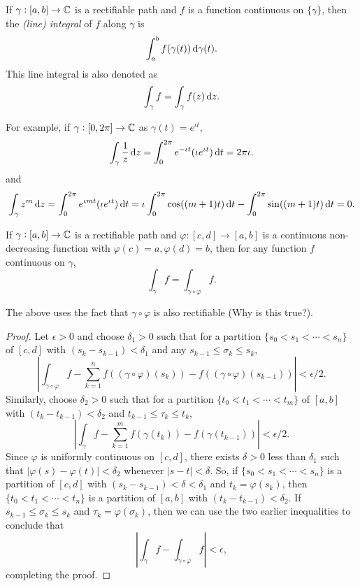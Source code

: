 	\begin{fdef}
		If $\gamma : [a,b] \to \mathbb{C}$ is a rectifiable path and $f$ is a function continuous on $\{\gamma\}$, then the \emph{(line) integral} of $f$ along $\gamma$ is
		\[ \int_a^b f(\gamma(t)) \dif \gamma(t). \]
		This line integral is also denoted as
		\[ \int_\gamma f = \int_\gamma f(z) \dif z. \]
	\end{fdef}

	For example, if $\gamma:[0,2\pi] \to \mathbb{C}$ as $\gamma(t) = e^{\iota t}$,
	\[ \int_\gamma \frac{1}{z} \dif z = \int_0^{2\pi} e^{-\iota t} (\iota e^{\iota t}) \dif t = 2 \pi \iota. \]
	and
	\[ \int_\gamma z^m \dif z = \int_0^{2\pi} e^{\iota m t} (\iota e^{\iota t}) \dif t = \iota \int_0^{2\pi} \cos((m+1)t) \dif t - \int_0^{2\pi} \sin((m+1)t) \dif t = 0. \]

	\begin{theorem}
		If $\gamma : [a,b] \to \mathbb{C}$ is a rectifiable path and $\varphi : [c,d] \to [a,b]$ is a continuous non-decreasing function with $\varphi(c) = a, \varphi(d) = b$, then for any function $f$ continuous on $\gamma$,
		\[ \int_\gamma f = \int_{\gamma \circ \varphi} f. \]
	\end{theorem}

	\begin{remark}
		The above uses the fact that $\gamma \circ \varphi$ is also rectifiable (Why is this true?).
	\end{remark}

	\begin{proof}
		Let $\epsilon > 0$ and choose $\delta_1 > 0$ such that for a partition $\{ s_0 < s_1 < \cdots  < s_n \}$ of $[c,d]$ with $(s_{k} - s_{k-1}) < \delta_1$ and any $s_{k-1} \le \sigma_k \le s_k$,
		\[ \left| \int_{\gamma \circ \varphi} f - \sum_{k=1}^{n} f((\gamma \circ \varphi)(s_k)) - f((\gamma \circ \varphi)(s_{k-1})) \right| < \epsilon/2. \]
		Similarly, choose $\delta_2 > 0$ such that for a partition $\{ t_0 < t_1 < \cdots < t_m \}$ of $[a,b]$ with $(t_k - t_{k-1}) < \delta_2$ and $t_{k-1} \le \tau_k \le t_k$,
		\[ \left| \int_{\gamma} f - \sum_{k=1}^{m} f(\gamma(t_k)) - f(\gamma(t_{k-1})) \right| < \epsilon/2. \]
		Since $\varphi$ is uniformly continuous on $[c,d]$, there exists $\delta > 0$ less than $\delta_1$ such that $|\varphi(s) - \varphi(t)| < \delta_2$ whenever $|s-t| < \delta$. So, if $\{ s_0 < s_1 < \cdots < s_n \}$ is a partition of $[c,d]$ with $(s_k - s_{k-1}) < \delta < \delta_1$ and $t_k = \varphi(s_k)$, then $\{ t_0 < t_1 < \cdots < t_n \}$ is a partition of $[a,b]$ with $(t_k - t_{k-1}) < \delta_2$. If $s_{k-1} \le \sigma_k \le s_k$ and $\tau_k = \varphi(\sigma_k)$, then we can use the two earlier inequalities to conclude that
		\[ \left| \int_\gamma f - \int_{\gamma \circ \varphi} f \right| < \epsilon, \]
		completing the proof.
	\end{proof}

